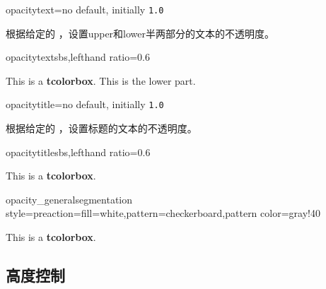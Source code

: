 \begin{docTcbKey}{opacitytext}{=}{no default, initially \texttt{1.0}}

根据给定的 ，设置upper和lower半两部分的文本的不透明度。
\begin{exdispExample*}{opacitytext}{sbs,lefthand ratio=0.6}
\begin{tcolorbox}[enhanced,opacitytext=0.5,
  interior style={preaction={fill=white},pattern=checkerboard,pattern color=gray!40}]
This is a \textbf{tcolorbox}.
\tcblower
This is the lower part.
\end{tcolorbox}
\end{exdispExample*}
\end{docTcbKey}


\begin{docTcbKey}{opacitytitle}{=}{no default, initially \texttt{1.0}}

根据给定的 ，设置标题的文本的不透明度。
\begin{exdispExample*}{opacitytitle}{sbs,lefthand ratio=0.6}
\begin{tcolorbox}[enhanced,opacitytitle=0.7,
  coltitle=black,
  fonttitle=\bfseries,title=This is a title,
  title style={preaction={fill=white},pattern=checkerboard,pattern color=gray!40}]
This is a \textbf{tcolorbox}.
\end{tcolorbox}
\end{exdispExample*}
\end{docTcbKey}


\begin{exdispExample*}{opacity_general}{segmentation style={preaction={fill=white},pattern=checkerboard,pattern color=gray!40}}
\begin{tcolorbox}[enhanced jigsaw,fonttitle=\bfseries,title=This is a title,
  opacityframe=0.5,opacityback=0.25,opacitybacktitle=0.25,opacitytext=0.8,
  colback=red!5!white,colframe=red!75!black,colbacktitle=yellow!20!red]
This is a \textbf{tcolorbox}.
\end{tcolorbox}
\end{exdispExample*}



 


\subsection{高度控制}\label{sec:heightcontrol}

